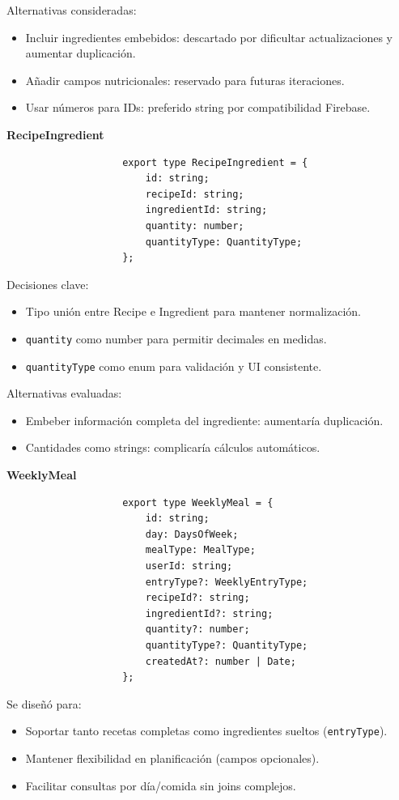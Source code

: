 \documentclass[twoside, openright, 11pt]{report}
\begin{document}
				Alternativas consideradas:
				\begin{itemize}
					\item Incluir ingredientes embebidos: descartado por dificultar actualizaciones y aumentar duplicación.
					\item Añadir campos nutricionales: reservado para futuras iteraciones.
					\item Usar números para IDs: preferido string por compatibilidad Firebase.
				\end{itemize}
				
				
				\textbf{RecipeIngredient}
				\begin{lstlisting}
					export type RecipeIngredient = {
						id: string;
						recipeId: string;
						ingredientId: string;
						quantity: number;
						quantityType: QuantityType;
					};
				\end{lstlisting}
				
				Decisiones clave:
				\begin{itemize}
					\item Tipo unión entre Recipe e Ingredient para mantener normalización.
					\item \texttt{quantity} como number para permitir decimales en medidas.
					\item \texttt{quantityType} como enum para validación y UI consistente.
				\end{itemize}
				
				Alternativas evaluadas:
				\begin{itemize}
					\item Embeber información completa del ingrediente: aumentaría duplicación.
					\item Cantidades como strings: complicaría cálculos automáticos.
				\end{itemize}
			
				
				\textbf{WeeklyMeal}
				\begin{lstlisting}
					export type WeeklyMeal = {
						id: string;
						day: DaysOfWeek;
						mealType: MealType;
						userId: string;
						entryType?: WeeklyEntryType;
						recipeId?: string;
						ingredientId?: string;
						quantity?: number;
						quantityType?: QuantityType;
						createdAt?: number | Date;
					};
				\end{lstlisting}
				
				Se diseñó para:
				\begin{itemize}
					\item Soportar tanto recetas completas como ingredientes sueltos (\texttt{entryType}).
					\item Mantener flexibilidad en planificación (campos opcionales).
					\item Facilitar consultas por día/comida sin joins complejos.
				\end{itemize}
				
\end{document}
